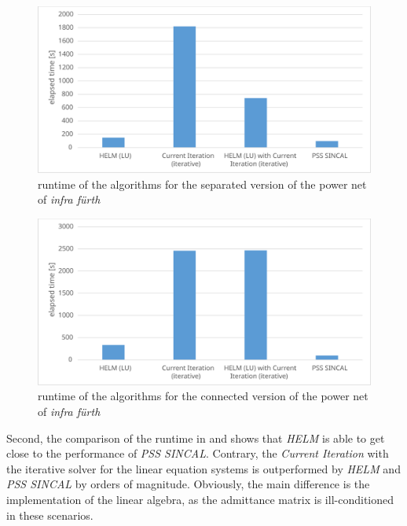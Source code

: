 \begin{figure}
	\centering
	\includegraphics[scale=0.7]{figures/big_net_separate_runtime}
	\caption[Comparison, \emph{infra fürth}, separate, runtime]{runtime of the algorithms for the separated version of the power net of \emph{infra fürth}}
	\label{fig:big_net_separate_runtime}
\end{figure}

\begin{figure}
	\centering
	\includegraphics[scale=0.7]{figures/big_net_combined_runtime}
	\caption[Comparison, \emph{infra fürth}, connected, runtime]{runtime of the algorithms for the connected version of the power net of \emph{infra fürth}}
	\label{fig:big_net_combined_runtime}
\end{figure}

Second, the comparison of the runtime in  and  shows that \emph{HELM} is able to get close to the performance of \emph{PSS SINCAL}. Contrary, the \emph{Current Iteration} with the iterative solver for the linear equation systems is outperformed by \emph{HELM} and \emph{PSS SINCAL} by orders of magnitude. Obviously, the main difference is the implementation of the linear algebra, as the admittance matrix is ill-conditioned in these scenarios.

